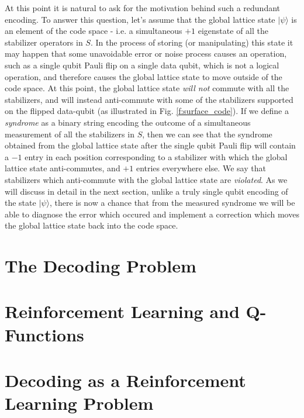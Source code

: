 \documentclass[onecolumn,preprintnumbers,amsmath,amssymb,notitlepage,nofootinbib,longbibliography,superscriptaddress]{revtex4-1}
\begin{document}
    At this point it is natural to ask for the motivation behind such a redundant encoding. To answer this question, let's assume that the global lattice state $|\psi\rangle$ is an element of the code space - i.e. a simultaneous $+1$ eigenstate of all the stabilizer operators in $S$. In the process of storing (or manipulating) this state it may happen that some unavoidable error or noise process causes an operation, such as a single qubit Pauli flip on a single data qubit, which is not a logical operation, and therefore causes the global lattice state to move outside of the code space. At this point, the global lattice state \textit{will not} commute with all the stabilizers, and will instead anti-commute with some of the stabilizers supported on the flipped data-qubit (as illustrated in Fig. \ref{f:surface_code}). If we define a \textit{syndrome} as a binary string encoding the outcome of a simultaneous measurement of all the stabilizers in $S$, then we can see that the syndrome obtained from the global lattice state after the single qubit Pauli flip will contain a $-1$ entry in each position corresponding to a stabilizer with which the global lattice state anti-commutes, and $+1$ entries everywhere else. We say that stabilizers which anti-commute with the global lattice state are \textit{violated}. As we will discuss in detail in the next section, unlike a truly single qubit encoding of the state $|\psi\rangle$, there is now a chance that from the measured syndrome we will be able to diagnose the error which occured and implement a correction which moves the global lattice state back into the code space. 



\section{The Decoding Problem}\label{s:the_decoding_problem}

\section{Reinforcement Learning and Q-Functions}\label{s:reinforcement_learning}
\section{Decoding as a Reinforcement Learning Problem}\label{s:decoding_as_rl}
\end{document}
